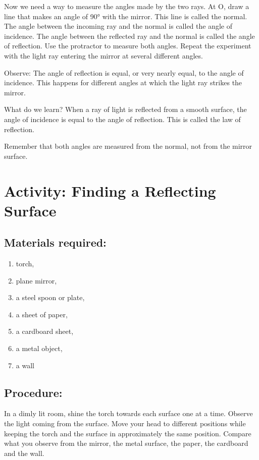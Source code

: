 \documentclass{xtufte-handout}
\begin{document}
Now we need a way to measure the angles made by the two rays. At O, draw a line that makes an angle of 90° with the mirror. This line is called the normal. The angle between the incoming ray and the normal is called the angle of incidence. The angle between the reflected ray and the normal is called the angle of reflection. Use the protractor to measure both angles. Repeat the experiment with the light ray entering the mirror at several different angles.

Observe: The angle of reflection is equal, or very nearly equal, to the angle of incidence. This happens for different angles at which the light ray strikes the mirror.

What do we learn? When a ray of light is reflected from a smooth surface, the angle of incidence is equal to the angle of reflection. This is called the law of reflection.

Remember that both angles are measured from the normal, not from the mirror surface.




\section{Activity: Finding a Reflecting Surface}

\subsection{Materials required:}
\begin{enumerate} 
  \item torch, 
  \item plane mirror, 
  \item a steel spoon or plate, 
  \item a sheet of paper, 
  \item a cardboard sheet, 
  \item a metal object, 
  \item a wall
\end{enumerate}
\subsection{Procedure:}
In a dimly lit room, shine the torch towards each surface one at a time. Observe the light coming from the surface. Move your head to different positions while keeping the torch and the surface in approximately the same position. Compare what you observe from the mirror, the metal surface, the paper, the cardboard and the wall.
\end{document}
